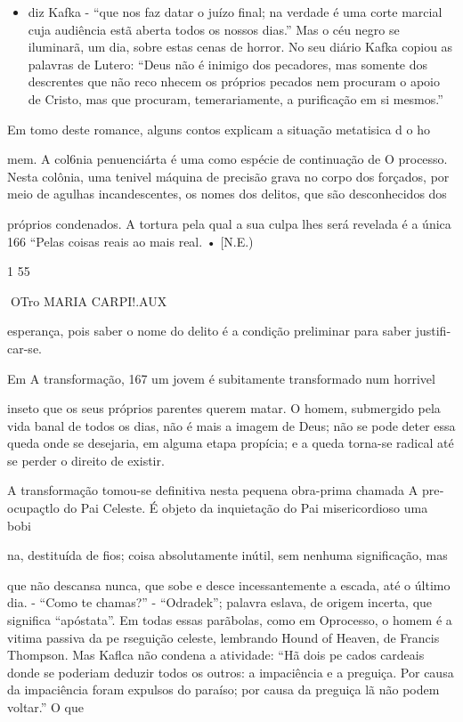 \begin{itemize}
\tightlist
\item
  diz Kafka - ``que nos faz datar o juízo final; na verdade é uma corte
  marcial cuja audiência estã aberta todos os nossos dias.'' Mas o céu
  negro se iluminarã, um dia, sobre estas cenas de horror. No seu diário
  Kafka copiou as palavras de Lutero: ``Deus não é inimigo dos
  pecadores, mas somente dos descrentes que não reco­ nhecem os próprios
  pecados nem procuram o apoio de Cristo, mas que procuram,
  temerariamente, a purificação em si mesmos.''
\end{itemize}

Em tomo deste romance, alguns contos explicam a situação metatisica d o
ho­

mem. A col6nia penuenciárta é uma como espécie de continuação de O
processo. Nesta colônia, uma tenivel máquina de precisão grava no corpo
dos forçados, por meio de agulhas incandescentes, os nomes dos delitos,
que são desconhecidos dos

próprios condenados. A tortura pela qual a sua culpa lhes será revelada
é a única 166 ``Pelas coisas reais ao mais real. • {[}N.E.)

1 55

OTro MARIA CARPI!.AUX

esperança, pois saber o nome do delito é a condição preliminar para
saber justifi­ car-se.

Em A transformação, 167 um jovem é subitamente transformado num horrivel

inseto que os seus próprios parentes querem matar. O homem, submergido
pela vida banal de todos os dias, não é mais a imagem de Deus; não se
pode deter essa queda onde se desejaria, em alguma etapa propícia; e a
queda torna-se radical até se perder o direito de existir.

A transformação tomou-se definitiva nesta pequena obra-prima chamada A
pre­ ocupaçtlo do Pai Celeste. É objeto da inquietação do Pai
misericordioso uma bobi­

na, destituída de fios; coisa absolutamente inútil, sem nenhuma
significação, mas

que não descansa nunca, que sobe e desce incessantemente a escada, até o
último dia. - ``Como te chamas?'' - ``Odradek''; palavra eslava, de
origem incerta, que significa ``apóstata''. Em todas essas parãbolas,
como em Oprocesso, o homem é a vitima passiva da pe rseguição celeste,
lembrando Hound of Heaven, de Francis Thompson. Mas Kaflca não condena a
atividade: ``Hã dois pe cados cardeais donde se poderiam deduzir todos
os outros: a impaciência e a preguiça. Por causa da impaciência foram
expulsos do paraíso; por causa da preguiça lã não podem voltar.'' O que

